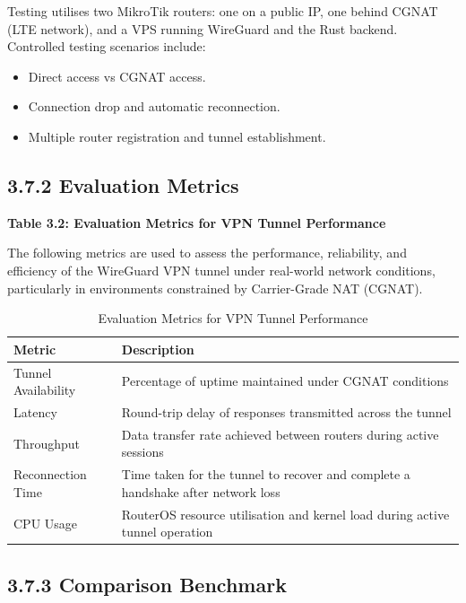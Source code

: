 \documentclass[12pt,a4paper,oneside]{report}
\begin{document}
Testing utilises two MikroTik routers: one on a public IP, one behind CGNAT (LTE network), and a VPS running WireGuard and the Rust backend. Controlled testing scenarios include:

\begin{itemize}
  \item Direct access vs CGNAT access.
  \item Connection drop and automatic reconnection.
  \item Multiple router registration and tunnel establishment.
\end{itemize}

\subsection{3.7.2 Evaluation Metrics}

\textbf{Table 3.2: Evaluation Metrics for VPN Tunnel Performance}

\vspace{0.3cm}
The following metrics are used to assess the performance, reliability, and efficiency of the WireGuard VPN tunnel under real-world network conditions, particularly in environments constrained by Carrier-Grade NAT (CGNAT).

\begin{table}[htbp]
  \centering
  \caption{Evaluation Metrics for VPN Tunnel Performance}
  {\small
  \begin{tabular}{|p{3.21cm}|p{10.00cm}|}
    \hline
    \textbf{Metric} & \textbf{Description} \\
    \hline
    Tunnel Availability & Percentage of uptime maintained under CGNAT conditions \\
    Latency & Round-trip delay of responses transmitted across the tunnel \\
    Throughput & Data transfer rate achieved between routers during active sessions \\
    Reconnection Time & Time taken for the tunnel to recover and complete a handshake after network loss \\
    CPU Usage & RouterOS resource utilisation and kernel load during active tunnel operation \\
    \hline
  \end{tabular}
  }
\end{table}

\subsection{3.7.3 Comparison Benchmark}
\end{document}
